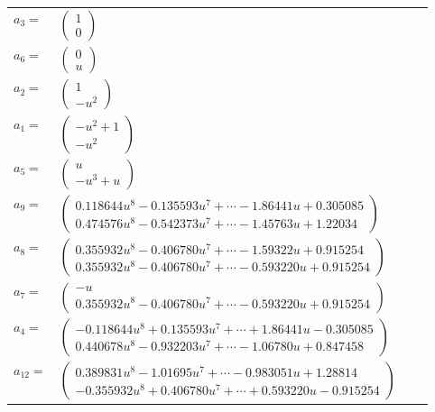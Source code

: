 \documentclass[1p]{elsarticle_modified}
\theoremstyle{definition}
\begin{document}
\begin{tabular}{m{7pt} m{180pt} m{7pt} m{180pt} }
\flushright $a_{3}=$&$\begin{pmatrix}1\\0\end{pmatrix}$ \\
\flushright $a_{6}=$&$\begin{pmatrix}0\\u\end{pmatrix}$ \\
\flushright $a_{2}=$&$\begin{pmatrix}1\\- u^2\end{pmatrix}$ \\
\flushright $a_{1}=$&$\begin{pmatrix}- u^2+1\\- u^2\end{pmatrix}$ \\
\flushright $a_{5}=$&$\begin{pmatrix}u\\- u^3+u\end{pmatrix}$ \\
\flushright $a_{9}=$&$\begin{pmatrix}0.118644 u^{8}-0.135593 u^{7}+\cdots-1.86441 u+0.305085\\0.474576 u^{8}-0.542373 u^{7}+\cdots-1.45763 u+1.22034\end{pmatrix}$ \\
\flushright $a_{8}=$&$\begin{pmatrix}0.355932 u^{8}-0.406780 u^{7}+\cdots-1.59322 u+0.915254\\0.355932 u^{8}-0.406780 u^{7}+\cdots-0.593220 u+0.915254\end{pmatrix}$ \\
\flushright $a_{7}=$&$\begin{pmatrix}- u\\0.355932 u^{8}-0.406780 u^{7}+\cdots-0.593220 u+0.915254\end{pmatrix}$ \\
\flushright $a_{4}=$&$\begin{pmatrix}-0.118644 u^{8}+0.135593 u^{7}+\cdots+1.86441 u-0.305085\\0.440678 u^{8}-0.932203 u^{7}+\cdots-1.06780 u+0.847458\end{pmatrix}$ \\
\flushright $a_{12}=$&$\begin{pmatrix}0.389831 u^{8}-1.01695 u^{7}+\cdots-0.983051 u+1.28814\\-0.355932 u^{8}+0.406780 u^{7}+\cdots+0.593220 u-0.915254\end{pmatrix}$ \\

\end{tabular}
\end{document}
